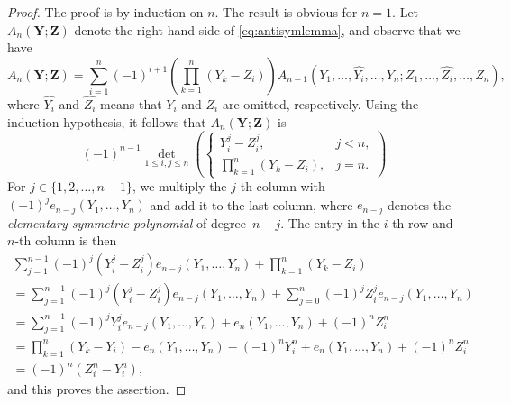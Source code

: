 \documentclass[12pt]{amsart}
\theoremstyle{definition}
\numberwithin{equation}{section}
\begin{document}
\begin{proof}  The proof is by induction on $n$. The result is obvious for $n=1$. 
	Let $A_n(\mathbf{Y};\mathbf{Z})$ denote the right-hand side of \eqref{eq:antisymlemma}, and 
	observe that we have 
	\begin{equation*}
	A_n(\mathbf{Y};\mathbf{Z})
	=  \sum_{i=1}^{n} (-1)^{i+1}  \left( \prod_{k=1}^n (Y_k-Z_i)  \right) 
	A_{n-1}(Y_1,\ldots,\widehat{Y_i},\ldots,Y_n;Z_1,\ldots,\widehat{Z_i},\ldots,Z_n),
	\end{equation*}
	where $\widehat{Y_i}$ and $\widehat{Z_i}$ means that $Y_i$ and $Z_i$ are omitted, respectively. Using the induction hypothesis, it follows that $A_n(\mathbf{Y};\mathbf{Z})$ is 
	\begin{equation*}
	(-1)^{n-1} \det_{1 \le i, j \le n} \left( \begin{cases} Y_i^j - Z_i^j,  & j < n, \\ 
		\prod_{k=1}^n (Y_k-Z_i), & j=n. 
	\end{cases}  \right)
	\end{equation*}
	For $j \in \{1,2,\ldots,n-1\}$, we multiply the $j$-th column with $(-1)^j e_{n-j}(Y_1,\ldots,Y_n)$ and add it to the last column, where $e_{n-j}$ denotes the \emph{elementary symmetric polynomial} of degree~$n-j$. The entry in the $i$-th row and $n$-th column is then
	\begin{multline*}
		\sum_{j=1}^{n-1} (-1)^j (Y_i^j - Z_i^j) e_{n-j}(Y_1,\ldots,Y_n) + \prod_{k=1}^n (Y_k-Z_i) \\ = 
		\sum_{j=1}^{n-1} (-1)^j (Y_i^j - Z_i^j) e_{n-j}(Y_1,\ldots,Y_n) + \sum_{j=0}^n (-1)^j Z_i^j e_{n-j}(Y_1,\ldots,Y_n) \\ = 
		\sum_{j=1}^{n-1} (-1)^j Y_i^j e_{n-j}(Y_1,\ldots,Y_n) + e_n(Y_1,\ldots,Y_n) + (-1)^n Z_i^n \\ =
		\prod_{k=1}^n (Y_k - Y_i) - e_n(Y_1,\ldots,Y_n) - (-1)^n Y_i^n + e_n(Y_1,\ldots,Y_n) + (-1)^n Z_i^n \\ = 
		(-1)^n \left( Z_i^n - Y_i^n \right), 
	\end{multline*}                            
	and this proves the assertion.                     
\end{proof}
\end{document}
